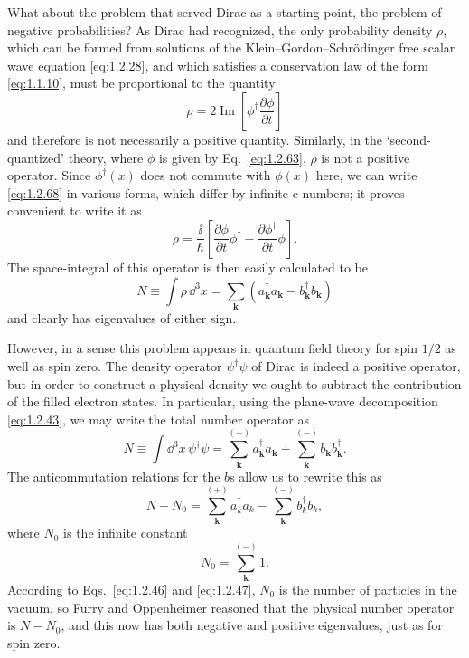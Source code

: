 What about the problem that served Dirac as a starting point, the problem of
negative probabilities? As Dirac had recognized, the only probability density
$\rho$, which can be formed from solutions of the
Klein--Gordon--Schr\"odinger free scalar wave equation \eqref{eq:1.2.28}, and which
satisfies a conservation law of the form \eqref{eq:1.1.10}, must be proportional to the
quantity
\begin{equation}
  \rho=2\mathop{\mathrm{Im}}\left[
    \phi^{\dagger}\frac{\partial\phi}{\partial t}\right]
  \tag{1.2.68}\label{eq:1.2.68}
\end{equation}
and therefore is not necessarily a positive quantity. Similarly, in the
`second-quantized' theory, where $\phi$ is given by Eq.~\eqref{eq:1.2.63}, $\rho$ is not
a positive operator. Since $\phi^{\dagger}(x)$ does not commute with $\phi(x)$
here, we can write \eqref{eq:1.2.68} in various forms, which differ by infinite
c-numbers; it proves convenient to write it as
\begin{equation}
  \rho=\frac{\ii}{\hbar}\left[
    \frac{\partial\phi}{\partial t}\phi^{\dagger}
    -\frac{\partial\phi^{\dagger}}{\partial t}\phi\right].
  \tag{1.2.69}\label{eq:1.2.69}
\end{equation}
The space-integral of this operator is then easily calculated to be
\begin{equation}
  N\equiv\int\rho\,\dd^3x
  =\sum_{\mathbf k}\left(
    a^{\dagger}_{\mathbf k}a_{\mathbf k}
    -b^{\dagger}_{\mathbf k}b_{\mathbf k}\right)
  \tag{1.2.70}\label{eq:1.2.70}
\end{equation}
and clearly has eigenvalues of either sign.

However, in a sense this problem appears in quantum field theory for spin
$1/2$ as well as spin zero. The density operator $\psi^{\dagger}\psi$ of
Dirac is indeed a positive operator, but in order to construct a physical
density we ought to subtract the contribution of the filled electron states.
In particular, using the plane-wave decomposition \eqref{eq:1.2.43}, we may write the
total number operator as
\[
  N\equiv\int \dd^3x\,\psi^{\dagger}\psi
  =\sum_{\mathbf k}^{(+)}a^{\dagger}_{\mathbf k}a_{\mathbf k}
   +\sum_{\mathbf k}^{(-)}b_{\mathbf k}b^{\dagger}_{\mathbf k}.
\]
The anticommutation relations for the $b$s allow us to rewrite this as
\begin{equation}
  N-N_0=\sum_{\mathbf k}^{(+)}a_k^{\dagger}a_k
    -\sum_{\mathbf k}^{(-)}b_k^{\dagger}b_k,
  \tag{1.2.71}\label{eq:1.2.71}
\end{equation}
where $N_0$ is the infinite constant
\begin{equation}
  N_0=\sum_{\mathbf k}^{(-)}1.
  \tag{1.2.72}\label{eq:1.2.72}
\end{equation}
According to Eqs.~\eqref{eq:1.2.46} and \eqref{eq:1.2.47}, $N_0$ is the number of particles in
the vacuum, so Furry and Oppenheimer reasoned that the physical number
operator is $N-N_0$, and this now has both negative and positive eigenvalues,
just as for spin zero.


